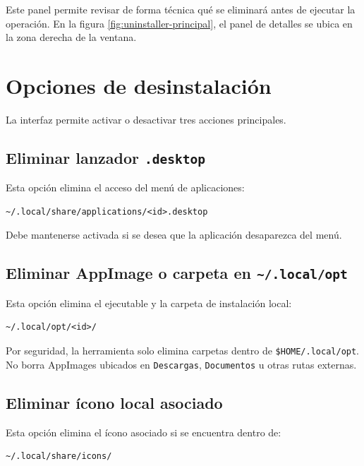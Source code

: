 \documentclass[11pt,a4paper]{article}
\begin{document}
Este panel permite revisar de forma técnica qué se eliminará antes de ejecutar la operación. En la figura \ref{fig:uninstaller-principal}, el panel de detalles se ubica en la zona derecha de la ventana.

\section{Opciones de desinstalación}

La interfaz permite activar o desactivar tres acciones principales.

\subsection{Eliminar lanzador \texttt{.desktop}}

Esta opción elimina el acceso del menú de aplicaciones:

\begin{lstlisting}[style=textstyle]
~/.local/share/applications/<id>.desktop
\end{lstlisting}

Debe mantenerse activada si se desea que la aplicación desaparezca del menú.

\subsection{Eliminar AppImage o carpeta en \texttt{\~{}/.local/opt}}

Esta opción elimina el ejecutable y la carpeta de instalación local:

\begin{lstlisting}[style=textstyle]
~/.local/opt/<id>/
\end{lstlisting}

Por seguridad, la herramienta solo elimina carpetas dentro de \texttt{\$HOME/.local/opt}. No borra AppImages ubicados en \texttt{Descargas}, \texttt{Documentos} u otras rutas externas.

\subsection{Eliminar ícono local asociado}

Esta opción elimina el ícono asociado si se encuentra dentro de:

\begin{lstlisting}[style=textstyle]
~/.local/share/icons/
\end{lstlisting}
\end{document}

